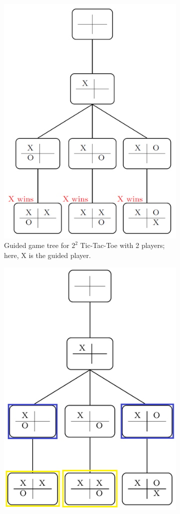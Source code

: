 \documentclass[12pt,a4paper]{article}
\begin{document}
\begin{figure}
\begin{subfigure}{.45\textwidth}
  \centering
	\includegraphics[scale=.65]{./img/isotree.png}
	\caption{Guided game tree for $2^2$ Tic-Tac-Toe with 2 players; here, X is the guided player.} \label{fig:guided_tree}
\end{subfigure}%
\hfill
\begin{subfigure}{.45\textwidth}
  \centering
	\includegraphics[scale=.65]{./img/equivtree.png}

\end{subfigure}
\end{figure}
\end{document}
